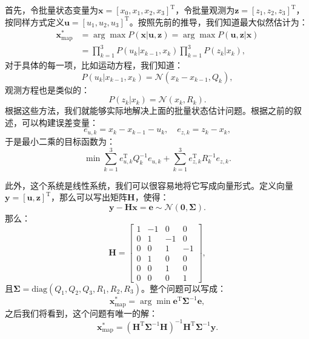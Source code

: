首先，令批量状态变量为$\bm{x} = [x_0,x_1, x_2, x_3]^\mathrm{T}$，令批量观测为$\bm{z} = [z_1,z_2,z_3]^\mathrm{T}$，按同样方式定义$\bm{u}=[u_1,u_2,u_3]^\mathrm{T}$。按照先前的推导，我们知道最大似然估计为：
\begin{equation}
\begin{aligned}
{\bm{x}_{\mathrm{map}}^*} &= \arg \max P(\bm{x}|\bm{u},\bm{z}) = \arg \max P(\bm{u},\bm{z}|\bm{x})\\
 &= \prod\limits_{k = 1}^3 {P({u_k}|{x_{k - 1}},{x_k})\prod\limits_{k = 1}^3 {P\left( {{z_k}|{x_k}} \right)} }, 
\end{aligned}
\end{equation}
对于具体的每一项，比如运动方程，我们知道：
\begin{equation}
P({u_k}|{x_{k - 1}},{x_k}) = \mathcal{N}({x_k} - {x_{k - 1}},{Q_k}),
\end{equation}
观测方程也是类似的：
\begin{equation}
P\left( {{z_k}|{x_k}} \right) = \mathcal{N}\left( {{x_k},{R_k}} \right).
\end{equation}
根据这些方法，我们就能够实际地解决上面的批量状态估计问题。根据之前的叙述，可以构建误差变量：
\begin{equation}
{e_{u,k}} = {x_k} - {x_{k - 1}} - {u_k}, \quad {e_{z,k}} = {z_k} - {x_k},
\end{equation}
于是最小二乘的目标函数为：
\begin{equation}
\min \sum\limits_{k = 1}^3 {e_{u,k}^\mathrm{T} Q_k^{ - 1}{e_{u,k}}}  + \sum\limits_{k = 1}^3 {e_{z,k}^\mathrm{T}{R^{ - 1}_k}{e_{z,k}}}. 
\end{equation}

此外，这个系统是线性系统，我们可以很容易地将它写成向量形式。定义向量$\bm{y}=[\bm{u}, \bm{z}]^\mathrm{T}$，那么可以写出矩阵$\bm{H}$，使得：
\begin{equation}
\bm{y}-\bm{H}\bm{x} = \bm{e} \sim \mathcal{N}(\bm{0}, \boldsymbol{\Sigma}).
\end{equation}
那么：
\begin{equation}
\bm{H} = \left[ {\begin{array}{*{20}{c}}
1&{ - 1}&0&0\\
0&1&{ - 1}&0\\
0&0&1&{ - 1}\\
\hline
0&1&0&0\\
0&0&1&0\\
0&0&0&1
\end{array}} \right],
\end{equation}
且$\boldsymbol{\Sigma}=\mathrm{diag}(Q_1, Q_2, Q_3, R_1, R_2, R_3)$。整个问题可以写成：
\begin{equation}
\bm{x}^*_{\mathrm{map}} = \arg \min \bm{e}^\mathrm{T} \boldsymbol{\Sigma}^{-1} \bm{e},
\end{equation}
之后我们将看到，这个问题有唯一的解：
\begin{equation}
\bm{x}^*_{\mathrm{map}} = (\bm{H}^\mathrm{T} \boldsymbol{\Sigma}^{-1} \bm{H})^{-1} \bm{H}^\mathrm{T} \boldsymbol{\Sigma}^{-1} \bm{y}.
\end{equation}

